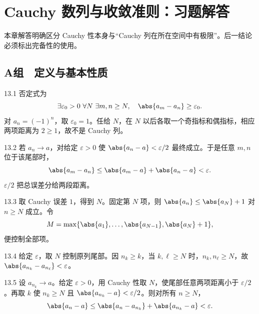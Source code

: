\chapter{Cauchy 数列与收敛准则：习题解答}

\begin{chapterguide}
本章解答明确区分 Cauchy 性本身与“Cauchy 列在所在空间中有极限”。后一结论必须标出完备性的使用。
\end{chapterguide}

\section*{A组　定义与基本性质}

\begin{solution}{13.1}
否定式为
\[
 \exists\varepsilon_0>0\ \forall N\ \exists m,n\ge N,\quad
 \abs{a_m-a_n}\ge\varepsilon_0.
\]
对 \(a_n=(-1)^n\)，取 \(\varepsilon_0=1\)。任给 \(N\)，在 \(N\) 以后各取一个奇指标和偶指标，相应两项距离为 \(2\ge1\)，故不是 Cauchy 列。
\end{solution}

\begin{solution}{13.2}
若 \(a_n\to a\)，对给定 \(\varepsilon>0\) 使
\(\abs{a_n-a}<\varepsilon/2\) 最终成立。于是任意 \(m,n\) 位于该尾部时，
\[
 \abs{a_m-a_n}\le\abs{a_m-a}+\abs{a_n-a}<\varepsilon.
\]
\(\varepsilon/2\) 把总误差分给两段距离。
\end{solution}

\begin{solution}{13.3}
取 Cauchy 误差 \(1\)，得到 \(N\)。固定第 \(N\) 项，则
\(\abs{a_n}\le\abs{a_N}+1\) 对 \(n\ge N\) 成立。令
\[
 M=\max\{\abs{a_1},\ldots,\abs{a_{N-1}},\abs{a_N}+1\},
\]
便控制全部项。
\end{solution}

\begin{solution}{13.4}
给定 \(\varepsilon\)，取 \(N\) 控制原列尾部。因 \(n_k\ge k\)，当
\(k,\ell\ge N\) 时，\(n_k,n_\ell\ge N\)，故
\(\abs{a_{n_k}-a_{n_\ell}}<\varepsilon\)。
\end{solution}

\begin{solution}{13.5}
设 \(a_{n_k}\to a\)。给定 \(\varepsilon>0\)，用 Cauchy 性取 \(N\)，使尾部任意两项距离小于 \(\varepsilon/2\)。再取 \(k\) 使
\(n_k\ge N\) 且 \(\abs{a_{n_k}-a}<\varepsilon/2\)。则对所有 \(n\ge N\)，
\[
 \abs{a_n-a}\le\abs{a_n-a_{n_k}}+\abs{a_{n_k}-a}<\varepsilon.
\]
\end{solution}

